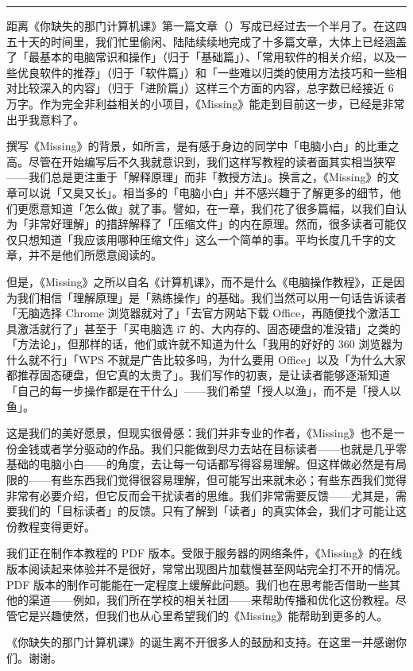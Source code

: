 
\begin{center}\rule{0.5\linewidth}{0.5pt}\end{center}

距离《你缺失的那门计算机课》第一篇文章（）写成已经过去一个半月了。在这四五十天的时间里，我们忙里偷闲、陆陆续续地完成了十多篇文章，大体上已经涵盖了「最基本的电脑常识和操作」（归于「基础篇」）、「常用软件的相关介绍，以及一些优良软件的推荐」（归于「软件篇」）和「一些难以归类的使用方法技巧和一些相对比较深入的内容」（归于「进阶篇」）这样三个方面的内容，总字数已经接近 6 万字。作为完全非利益相关的小项目，《Missing》能走到目前这一步，已经是非常出乎我意料了。

撰写《Missing》的背景，如所言，是有感于身边的同学中「电脑小白」的比重之高。尽管在开始编写后不久我就意识到，我们这样写教程的读者面其实相当狭窄——我们总是更注重于「解释原理」而非「教授方法」。换言之，《Missing》的文章可以说「又臭又长」。相当多的「电脑小白」并不感兴趣于了解更多的细节，他们更愿意知道「怎么做」就了事。譬如，在一章，我们花了很多篇幅，以我们自认为「非常好理解」的措辞解释了「压缩文件」的内在原理。然而，很多读者可能仅仅只想知道「我应该用哪种压缩文件」这么一个简单的事。平均长度几千字的文章，并不是他们所愿意阅读的。

但是，《Missing》之所以自名《计算机课》，而不是什么《电脑操作教程》，正是因为我们相信「理解原理」是「熟练操作」的基础。我们当然可以用一句话告诉读者「无脑选择 Chrome 浏览器就对了」「去官方网站下载 Office，再随便找个激活工具激活就行了」甚至于「买电脑选 i7 的、大内存的、固态硬盘的准没错」之类的「方法论」，但那样的话，他们或许就不知道为什么「我用的好好的 360 浏览器为什么就不行」「WPS 不就是广告比较多吗，为什么要用 Office」以及「为什么大家都推荐固态硬盘，但它真的太贵了」。我们写作的初衷，是让读者能够逐渐知道「自己的每一步操作都是在干什么」——我们希望「授人以渔」，而不是「授人以鱼」。

这是我们的美好愿景，但现实很骨感：我们并非专业的作者，《Missing》也不是一份金钱或者学分驱动的作品。我们只能做到尽力去站在目标读者——也就是几乎零基础的电脑小白——的角度，去让每一句话都写得容易理解。但这样做必然是有局限的——有些东西我们觉得很容易理解，但可能写出来就未必；有些东西我们觉得非常有必要介绍，但它反而会干扰读者的思维。我们非常需要反馈——尤其是，需要我们的「目标读者」的反馈。只有了解到「读者」的真实体会，我们才可能让这份教程变得更好。

我们正在制作本教程的 PDF 版本。受限于服务器的网络条件，《Missing》的在线版本阅读起来体验并不是很好，常常出现图片加载慢甚至网站完全打不开的情况。PDF 版本的制作可能能在一定程度上缓解此问题。我们也在思考能否借助一些其他的渠道——例如，我们所在学校的相关社团——来帮助传播和优化这份教程。尽管它是兴趣使然，但我们也从心里希望我们的《Missing》能帮助到更多的人。

《你缺失的那门计算机课》的诞生离不开很多人的鼓励和支持。在这里一并感谢你们。谢谢。

